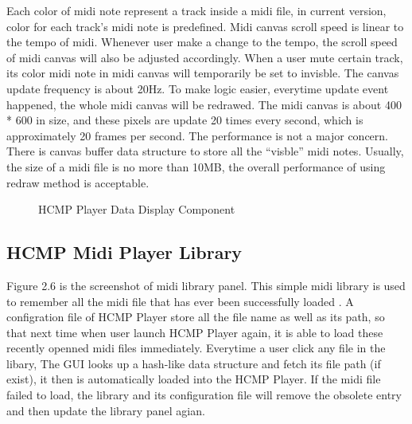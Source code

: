 Each color of midi note represent a track inside 
a midi file, in current version, color for each track's midi note is predefined. 
Midi canvas scroll speed is linear to the tempo of midi. Whenever user 
make a change to the tempo, the scroll speed of midi canvas will also be adjusted 
accordingly. When a user mute certain 
track, its color midi note in midi canvas will temporarily be set to invisble. 
The canvas
update frequency is about 20Hz. To make logic easier, everytime update event 
happened, the whole midi canvas will be redrawed. The midi canvas is about 400 * 600 
in size, and these pixels are update 20 times every second, which is approximately 
20 frames per second. The performance is not
a major concern. There is canvas buffer data 
structure to store all the ``visble'' midi notes. 
Usually, the size of a midi file is no more than 10MB, the overall performance of 
using redraw method is acceptable.

\begin{figure}[H]
\caption{HCMP Player Data Display Component}
\label{fig:speciation}
\end{figure}

\subsection{HCMP Midi Player Library}

Figure 2.6 is the screenshot of midi library panel. This simple midi library is 
used to remember all the midi file that has ever been successfully loaded . 
A configration file of HCMP Player store all the file name as well as its path, 
so that next time when user launch HCMP Player again, it is able to load these 
recently openned midi files immediately. Everytime a user click any file in the libary, 
The GUI looks up a hash-like data structure and fetch its file path (if exist),
it then is automatically
loaded into the HCMP Player. If the midi file failed to load, the library and its
configuration file will remove the obsolete entry and then update the library panel
agian.


